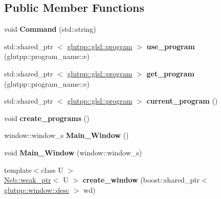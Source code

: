 \subsection*{\-Public \-Member \-Functions}
\begin{DoxyCompactItemize}
\item 
\hypertarget{classglutpp_1_1master_a69a240d5d10bd1282d60d390bde4a6c3}{void {\bfseries \-Command} (std\-::string)}\label{classglutpp_1_1master_a69a240d5d10bd1282d60d390bde4a6c3}

\item 
\hypertarget{classglutpp_1_1master_adf944b294dfa667ab320c291b0bec874}{std\-::shared\-\_\-ptr\*
$<$ \hyperlink{classglutpp_1_1glsl_1_1program}{glutpp\-::glsl\-::program} $>$ {\bfseries use\-\_\-program} (glutpp\-::program\-\_\-name\-::e)}\label{classglutpp_1_1master_adf944b294dfa667ab320c291b0bec874}

\item 
\hypertarget{classglutpp_1_1master_a98f2e11a5b87b6b4298cc3873c4f525f}{std\-::shared\-\_\-ptr\*
$<$ \hyperlink{classglutpp_1_1glsl_1_1program}{glutpp\-::glsl\-::program} $>$ {\bfseries get\-\_\-program} (glutpp\-::program\-\_\-name\-::e)}\label{classglutpp_1_1master_a98f2e11a5b87b6b4298cc3873c4f525f}

\item 
\hypertarget{classglutpp_1_1master_ad3c0bc9747d5da405283ff311716330f}{std\-::shared\-\_\-ptr\*
$<$ \hyperlink{classglutpp_1_1glsl_1_1program}{glutpp\-::glsl\-::program} $>$ {\bfseries current\-\_\-program} ()}\label{classglutpp_1_1master_ad3c0bc9747d5da405283ff311716330f}

\item 
\hypertarget{classglutpp_1_1master_ab476009c6503f6548a64dce36937b33e}{void {\bfseries create\-\_\-programs} ()}\label{classglutpp_1_1master_ab476009c6503f6548a64dce36937b33e}

\item 
\hypertarget{classglutpp_1_1master_a37a1fd8b933c2c60209638996b4da46a}{window\-::window\-\_\-s {\bfseries \-Main\-\_\-\-Window} ()}\label{classglutpp_1_1master_a37a1fd8b933c2c60209638996b4da46a}

\item 
\hypertarget{classglutpp_1_1master_af66d4b05d87fa96993bb4fc708ad9dca}{void {\bfseries \-Main\-\_\-\-Window} (window\-::window\-\_\-s)}\label{classglutpp_1_1master_af66d4b05d87fa96993bb4fc708ad9dca}

\item 
\hypertarget{classglutpp_1_1master_a683b657d3a5a45b736594d0572b16b26}{{\footnotesize template$<$class U $>$ }\\\hyperlink{classNeb_1_1weak__ptr}{\-Neb\-::weak\-\_\-ptr}$<$ \-U $>$ {\bfseries create\-\_\-window} (boost\-::shared\-\_\-ptr$<$ \hyperlink{classglutpp_1_1window_1_1desc}{glutpp\-::window\-::desc} $>$ wd)}\label{classglutpp_1_1master_a683b657d3a5a45b736594d0572b16b26}

\end{DoxyCompactItemize}

